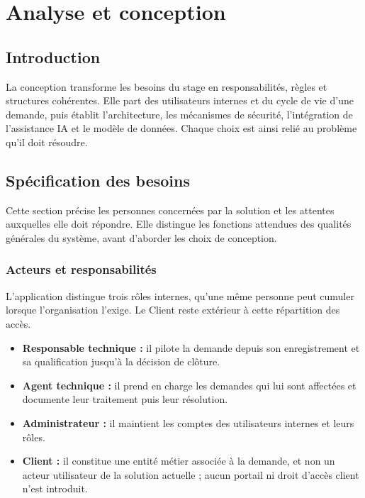 \chapter{Analyse et conception}
\label{chap:02-analyse-conception}
\clearpage

\section*{Introduction}
{}

La conception transforme les besoins du stage en responsabilités, règles et structures cohérentes. Elle part des utilisateurs internes et du cycle de vie d'une demande, puis établit l'architecture, les mécanismes de sécurité, l'intégration de l'assistance IA et le modèle de données. Chaque choix est ainsi relié au problème qu'il doit résoudre.

\section{Spécification des besoins}
\label{sec:02-specification-besoins}

Cette section précise les personnes concernées par la solution et les attentes auxquelles elle doit répondre. Elle distingue les fonctions attendues des qualités générales du système, avant d'aborder les choix de conception.

\subsection{Acteurs et responsabilités}
\label{subsec:02-acteurs-responsabilites}

L'application distingue trois rôles internes, qu'une même personne peut cumuler lorsque l'organisation l'exige. Le Client reste extérieur à cette répartition des accès.

\begin{itemize}
  \item \textbf{Responsable technique :} il pilote la demande depuis son enregistrement et sa qualification jusqu'à la décision de clôture.
  \item \textbf{Agent technique :} il prend en charge les demandes qui lui sont affectées et documente leur traitement puis leur résolution.
  \item \textbf{Administrateur :} il maintient les comptes des utilisateurs internes et leurs rôles.
  \item \textbf{Client :} il constitue une entité métier associée à la demande, et non un acteur utilisateur de la solution actuelle ; aucun portail ni droit d'accès client n'est introduit.
\end{itemize}

